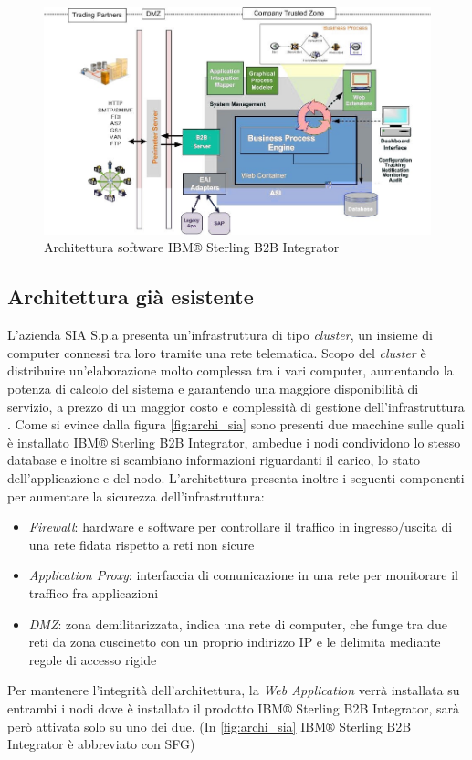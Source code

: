 \clearpage

\begin{figure}
\begin{center}
\includegraphics[width=1.0\columnwidth]{images/ibmarchitecture.jpg}
\end{center}
\caption{Architettura software IBM® Sterling B2B Integrator}
\label{fig:archi_sterling}
\end{figure}


\subsection{Architettura già esistente}
L'azienda SIA S.p.a presenta un'infrastruttura di tipo \textit{cluster}, un insieme di computer connessi tra loro tramite una rete telematica. Scopo del \textit{cluster} è distribuire un'elaborazione molto complessa tra i vari computer, aumentando la potenza di calcolo del sistema e garantendo una maggiore disponibilità di servizio, a prezzo di un maggior costo e complessità di gestione dell'infrastruttura \cite{cluster}. Come si evince dalla figura \ref{fig:archi_sia} sono presenti due macchine sulle quali è installato IBM® Sterling B2B Integrator, ambedue i nodi condividono lo stesso database e inoltre si scambiano informazioni riguardanti il carico, lo stato dell'applicazione e del nodo. L'architettura presenta inoltre i seguenti componenti per aumentare la sicurezza dell'infrastruttura:
\begin{itemize}
    \item \textit{Firewall}: hardware e software per controllare il traffico in ingresso/uscita di una rete fidata rispetto a reti non sicure
    \item \textit{Application Proxy}: interfaccia di comunicazione in una rete per monitorare il traffico fra applicazioni
    \item \textit{DMZ}: zona demilitarizzata, indica una rete di computer, che funge tra due reti da zona cuscinetto con un proprio indirizzo IP e le delimita mediante regole di accesso rigide
\end{itemize}
Per mantenere l'integrità dell'architettura, la \textit{Web Application} verrà installata su entrambi i nodi dove è installato il prodotto IBM® Sterling B2B Integrator, sarà però attivata solo su uno dei due. (In \ref{fig:archi_sia} IBM® Sterling B2B Integrator è abbreviato con SFG)



